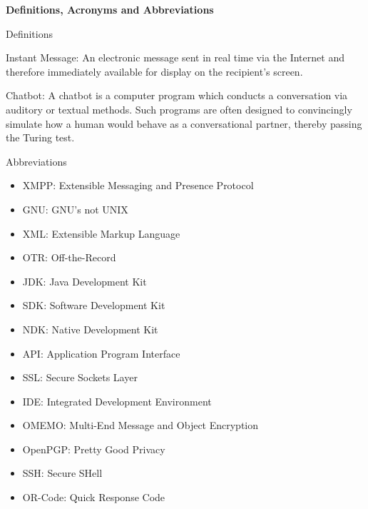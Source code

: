 \begin{center}
{\Huge \bf{Definitions, Acronyms and Abbreviations}\vskip 0.2in}
\end{center}
\large
{Definitions}

Instant Message: An electronic message sent in real time via the Internet and therefore immediately available for display on the recipient's screen.

Chatbot: A chatbot is a computer program which conducts a conversation via auditory or textual methods. Such programs are often designed to convincingly simulate how a human would behave as a conversational partner, thereby passing the Turing test.

\large{Abbreviations}
\begin{itemize}
\item XMPP: Extensible Messaging and Presence Protocol
\item GNU: GNU's not UNIX
\item XML: Extensible Markup Language
\item OTR: Off-the-Record
\item JDK: Java Development Kit
\item SDK: Software Development Kit
\item NDK: Native Development Kit
\item API: Application Program Interface
\item SSL: Secure Sockets Layer
\item IDE: Integrated Development Environment
\item OMEMO: Multi-End Message and Object Encryption
\item OpenPGP: Pretty Good Privacy
\item SSH: Secure SHell
\item OR-Code: Quick Response Code
\end{itemize}
